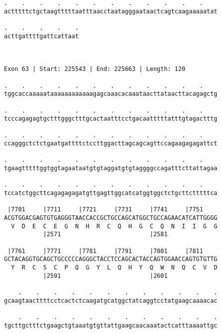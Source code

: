 \documentclass{article}
\begin{document}
\begin{Verbatim}
.    .    .    .    .    .    .    .    .    .    .    .    
actttttctgctaagtttttaatttaacctaatagggaataactcagtcaagaaaaatat
                                                            
.    .    .    .    .
acttgattttgattcattaat
                     
                     
 
Exon 63 | Start: 225543 | End: 225663 | Length: 120
 
.    .    .    .    .    .    .    .    .    .    .    .    
tggcaccaaaaataaaaaaaaaaaagagcaaacacaaataacttataacttacagagctg
                                                            
.    .    .    .    .    .    .    .    .    .    .    .    
tcccagagagtgctttgggctttgcactaatttcctgacaatttttatttgtagactttg
                                                            
.    .    .    .    .    .    .    .    .    .    .    .    
ccagggctctctgaatgattttctccttggacttagcagcagttccagaagagagattct
                                                            
.    .    .    .    .    .    .    .    .    .    .    .    
tgaagtttttggtggtagaataatgtgtaggatgtgtaggggccagatttcttattagaa
                                                            
.    .    .    .    .    .    .    .    .    .    .    .    
tccatctggcttcagagagagatgttgagttggcatcatggtggctctgcttctttttca
                                                            
 |7701     |7711     |7721     |7731     |7741     |7751    
ACGTGGACGAGTGTGAGGGTAACCACCGCTGCCAGCATGGCTGCCAGAACATCATTGGGG
  V  D  E  C  E  G  N  H  R  C  Q  H  G  C  Q  N  I  I  G  G
           |2571                         |2581              
  
 |7761     |7771     |7781     |7791     |7801     |7811    
GCTACAGGTGCAGCTGCCCCCAGGGCTACCTCCAGCACTACCAGTGGAACCAGTGTGTTG
  Y  R  C  S  C  P  Q  G  Y  L  Q  H  Y  Q  W  N  Q  C  V  D
           |2591                         |2601              
  
    .    .    .    .    .    .    .    .    .    .    .    .
gcaagtaacttttcctcactctcaagatgcatggctatcaggtcctatgaagcaaaacac
                                                            
    .    .    .    .    .    .    .    .    .    .    .    .
tgcttgctttctgaagctgtaaatgtgttattgaagcaacaaatactcatttaaaattgc
                                                            

\end{Verbatim}
\end{document}

